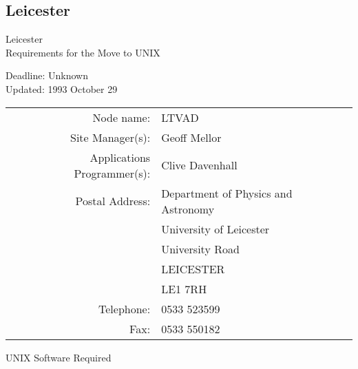 \newpage
\subsection{Leicester}

\renewcommand{\starsitename}{Leicester}
\renewcommand{\starnodename}{LTVAD}

\renewcommand{\starunixdate}{Unknown}
\renewcommand{\starupdate}{1993 October 29}

\renewcommand{\starsitetelephone}{0533 523599}
\renewcommand{\starsitefax}{0533 550182}

\begin{center}
{\Large\sc \starsitename \\ [2ex]
           Requirements for the Move to UNIX}

\vspace{3mm}
{\large\sc Deadline: \starunixdate \\ [1ex]
           Updated: \starupdate}
\end{center}

\vspace{5mm}

\begin{center}
\begin{tabular}{rl}
{\sc Node name:}                  & \starnodename \\
{\sc Site Manager(s):}            & Geoff Mellor \\
{\sc Applications Programmer(s):} & Clive Davenhall \\
{\sc Postal Address:}             & Department of Physics and Astronomy \\
                                  & University of Leicester \\
                                  & University Road \\
                                  & LEICESTER \\
                                  & LE1 7RH \\
{\sc Telephone:}                  & \starsitetelephone \\
{\sc Fax:}                        & \starsitefax \\
\end{tabular}
\end{center}

\vspace{5mm}
\begin{center}
{\large\sc UNIX Software Required}
\end{center}

